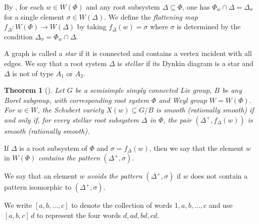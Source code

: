 \documentclass[11pt, reqno]{amsart}
\renewcommand{\subset}{\subseteq}
\newtheorem{Thm}{Theorem}[section]
\theoremstyle{definition}
\numberwithin{equation}{section}
\begin{document}





By \cite[Lem. 2.1]{BP-05}, for each $w\in W(\Phi)$ and any root subsystem $\Delta\subset\Phi$, one has $\Phi_w\cap \Delta=\Delta_{\sigma}$ for a single element $\sigma\in W(\Delta)$. 
We define the {\it flattening map} $f_\Delta:W(\Phi)\to W(\Delta)$ by taking $f_\Delta(w)=\sigma$ where $\sigma$ is determined by the condition $\Delta_{\sigma} = \Phi_w\cap \Delta$.

A graph is called a {\it star\/} if it is connected and contains a vertex incident with all edges.  We say that a root system $\Delta$ is {\it stellar\/} if its Dynkin diagram is a star and $\Delta$ is not of type $A_1$ or $A_2$.




\begin{Thm}[{\cite[Thm 2.2]{BP-05}}]\label{BP-main}
Let $G$ be a semisimple simply connected Lie group, 
$B$ be any Borel subgroup, with
corresponding root system $\Phi$ and Weyl group $W=W(\Phi)$.  For
$w\in W$, the Schubert variety $X(w) \subset G/B$ is smooth (rationally
smooth) if and only if, for every stellar root subsystem $\Delta$ in
$\Phi$, the pair $(\Delta^+,f_\Delta(w))$ is smooth (rationally
smooth).
\end{Thm}


If $\Delta$ is a root subsystem of $\Phi$ and $\sigma = f_\Delta(w)$, then we say that the element $w$ in $W(\Phi)$ \textit{contains the pattern} $(\Delta^+,\sigma)$.

We say that an element $w$ \textit{avoids the pattern} $(\Delta^+,\sigma)$ if $w$ does not contain a pattern isomorphic to $(\Delta^+,\sigma)$.

We write $[a,b,\dots,c]$ to denote the collection of words $1,a,b,\dots,c$ and use $[a,b,c]\,d$ to represent the four words $d, ad, bd, cd$.
\end{document}
